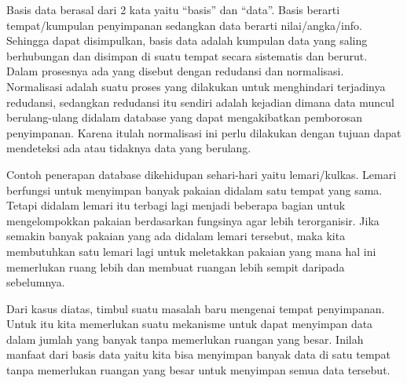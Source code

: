 \documentclass[a4paper,12 pt]{article}
\begin{document}
Basis data berasal dari 2 kata yaitu “basis” dan “data”. Basis berarti tempat/kumpulan penyimpanan sedangkan data berarti nilai/angka/info. Sehingga dapat disimpulkan, basis data adalah kumpulan data yang saling berhubungan dan disimpan di suatu tempat secara sistematis dan berurut. Dalam prosesnya ada yang disebut dengan redudansi dan normalisasi. Normalisasi adalah suatu proses yang dilakukan untuk menghindari terjadinya redudansi, sedangkan redudansi itu sendiri adalah kejadian dimana data muncul berulang-ulang didalam database yang dapat mengakibatkan pemborosan penyimpanan. Karena itulah normalisasi ini perlu dilakukan dengan tujuan dapat mendeteksi ada atau tidaknya data yang berulang.
\newline
\par Contoh penerapan database dikehidupan sehari-hari yaitu lemari/kulkas. Lemari berfungsi untuk menyimpan banyak pakaian didalam satu tempat yang sama. Tetapi didalam lemari itu terbagi lagi menjadi beberapa bagian untuk mengelompokkan pakaian berdasarkan fungsinya agar lebih terorganisir. Jika semakin banyak pakaian yang ada didalam lemari tersebut, maka kita membutuhkan satu lemari lagi untuk meletakkan pakaian yang mana hal ini memerlukan ruang lebih dan membuat ruangan lebih sempit daripada sebelumnya.
\newline
\par Dari kasus diatas, timbul suatu masalah baru mengenai tempat penyimpanan. Untuk itu kita memerlukan suatu mekanisme untuk dapat menyimpan data dalam jumlah yang banyak tanpa memerlukan ruangan yang besar. Inilah manfaat dari basis data yaitu kita bisa menyimpan banyak data di satu tempat tanpa memerlukan ruangan yang besar untuk menyimpan semua data tersebut.
\end{document}
